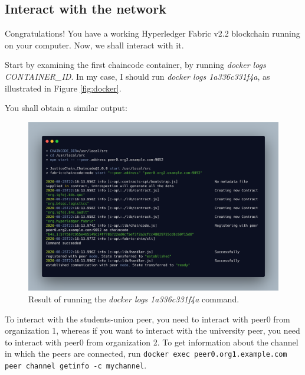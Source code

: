 \documentclass[12pt,a4paper]{article}
\theoremstyle{definition}
\begin{document}
\subsection{Interact with the network}
Congratulations! You have a working Hyperledger Fabric v2.2 blockchain running on your computer. Now, we shall interact with it. 

Start by examining the first chaincode container, by running \emph{docker logs CONTAINER\_ID}. In my case, I should run \emph{docker logs 1a336c331f4a}, as illustrated in Figure \ref{fig:docker}. 

You shall obtain a similar output:

\begin{figure}[h]
    \centering
    \includegraphics[scale=0.08]{figures/docker_logs_chaincode.png}
    \caption{Result of running the \emph{docker logs 1a336c331f4a} command.}
    \label{fig:docker_chaincode}
\end{figure}


To interact with the students-union peer, you need to interact with peer0 from organization 1, whereas if you want to interact with the university peer, you need to interact with peer0 from organization 2.
To get information about the channel in which the peers are connected, run \texttt{docker exec peer0.org1.example.com peer channel getinfo -c mychannel}.
\end{document}
